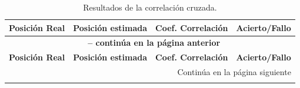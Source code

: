 \documentclass[spanish,openright]{book}
\begin{document}
\begin{center}
	\begin{longtable}{|c|c|c|c|}
\caption[Resultados de la correlación cruzada.]{Resultados de la correlación cruzada.} \label{table2} \\

\hline \multicolumn{1}{|c|}{\textbf{Posición Real}} & \multicolumn{1}{c|}{\textbf{Posición estimada}} & \multicolumn{1}{c|}{\textbf{Coef. Correlación}} & \multicolumn{1}{c|}{\textbf{Acierto/Fallo}} \\ \hline
\endfirsthead

\multicolumn{4}{c}{{\bfseries \tablename\ \thetable{} -- continúa en la página anterior}} \\
\hline \multicolumn{1}{|c|}{\textbf{Posición Real}} & \multicolumn{1}{c|}{\textbf{Posición estimada}} & \multicolumn{1}{c|}{\textbf{Coef. Correlación}} & \multicolumn{1}{c|}{\textbf{Acierto/Fallo}} \\ \hline
\endhead

\hline \multicolumn{4}{|r|}{{Continúa en la página siguiente}} \\ \hline
\endfoot

\hline \hline
\endlastfoot


\end{longtable}
\end{center}
\end{document}
